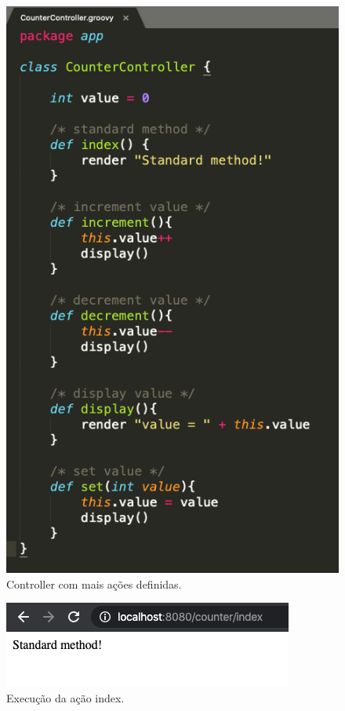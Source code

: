 \begin{figure}[H]
    \centering
    \includegraphics[scale=0.50]{images/grails-8.png}
    \caption{Controller com mais ações definidas.}
    \label{fig:grails-8}
\end{figure}

\begin{figure}[H]
    \centering
    \includegraphics[scale=0.50]{images/g-1.png}
    \caption{Execução da ação index.}
    \label{fig:g-1}
\end{figure}

